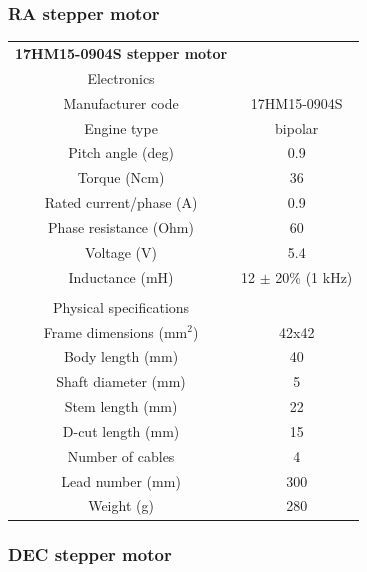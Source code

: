 \documentclass{article}
\begin{document}
\begin{multicols}{2}
        \subsubsection{RA stepper motor}
        \begin{minipage}{0.5\textwidth}
            \centering
            \begin{tabular}{cc}
                \textbf{17HM15-0904S stepper motor}&\\
                Electronics&\\
                \hline
                Manufacturer code & 17HM15-0904S\\
                Engine type & bipolar\\
                Pitch angle (deg) & 0.9 \\
                Torque (Ncm)& 36\\
                Rated current/phase (A) & 0.9\\
                Phase resistance (Ohm)& 60\\
                Voltage (V)& 5.4\\
                Inductance (mH)& 12 \(\pm\) 20\% (1 kHz)\\
                 & \\
                Physical specifications&\\
                \hline
                Frame dimensions (mm\(^2\))& 42x42 \\
                Body length (mm)& 40 \\
                Shaft diameter (mm)& 5 \\
                Stem length (mm)& 22 \\
                D-cut length (mm)& 15 \\
                Number of cables & 4\\
                Lead number (mm)& 300 \\
                Weight (g) & 280\\
                \hline
            \end{tabular}
            \label{tab:nema_17_specifics}
        \end{minipage}

        \subsubsection{DEC stepper motor}
        

\end{multicols}
\end{document}
